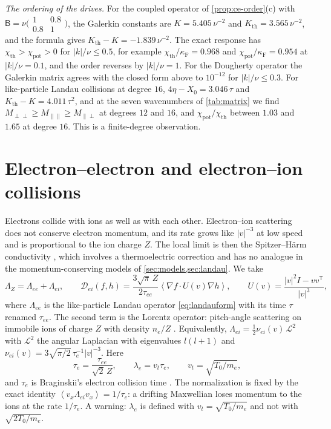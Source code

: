 \documentclass[11pt]{article}
\newcommand{\av}[1]{\left\langle #1\right\rangle}
\newcommand{\D}{\mathcal D}
\newcommand{\F}{\kappa_{\mathrm F}}
\newcommand{\thr}{\mathrm{th}}
\newcommand{\pot}{\mathrm{pot}}
\theoremstyle{definition}
\theoremstyle{remark}
\numberwithin{equation}{section}
\begin{document}
\emph{The ordering of the drives.} For the coupled operator of
\cref{prop:ce-order}(c) with $\mathsf B=\nu\bigl(\begin{smallmatrix}1&0.8\\0.8&1\end{smallmatrix}\bigr)$,
the Galerkin constants are $K=5.405\,\nu^{-2}$ and
$K_\thr=3.565\,\nu^{-2}$, and the formula gives
$K_\thr-K=-1.839\,\nu^{-2}$. The exact response has
$\chi_\thr>\chi_\pot>0$ for $|k|/\nu\leq0.5$, for example
$\chi_\thr/\F=0.968$ and $\chi_\pot/\F=0.954$ at $|k|/\nu=0.1$, and the
order reverses by $|k|/\nu=1$. For the Dougherty operator the Galerkin
matrix agrees with the closed form above to $10^{-12}$ for $|k|/\nu\leq0.3$.
For like-particle Landau collisions at degree $16$,
$4\eta-X_0=3.046\,\tau$ and $K_\thr-K=4.011\,\tau^2$, and at the seven
wavenumbers of \cref{tab:matrix} we find
$M_{\perp\perp}\geq M_{\parallel\parallel}\geq M_{\parallel\perp}$ at
degrees $12$ and $16$, and $\chi_\pot/\chi_\thr$ between $1.03$ and
$1.65$ at degree $16$. This is a finite-degree observation.

\FloatBarrier
\section{Electron--electron and electron--ion collisions}\label{sec:th-electron}

Electrons collide with ions as well as with each other. Electron--ion
scattering does not conserve electron momentum, and its rate grows like
$|v|^{-3}$ at low speed and is proportional to the ion charge $Z$. The
local limit is then the Spitzer--H\"arm conductivity
\cite{SpitzerHarm1953,Braginskii1965}, which involves a thermoelectric
correction and has no analogue in the momentum-conserving models of
\cref{sec:models,sec:landau}. We take
\begin{equation}
 \Lambda_Z=\Lambda_{ee}+\Lambda_{ei},\qquad
 \D_{ei}(f,h)=\frac{3\sqrt\pi\,Z}{2\tau_{ee}}
   \av{\nabla f\cdot U(v)\nabla h},\qquad
 U(v)=\frac{|v|^2I-vv^{\mathsf T}}{|v|^3},
 \label{eq:th-electron}
\end{equation}
where $\Lambda_{ee}$ is the like-particle Landau operator \eqref{eq:landauform} with its time $\tau$ renamed $\tau_{ee}$. The second
term is the Lorentz operator: pitch-angle scattering on immobile ions of
charge $Z$ with density $n_e/Z$ \cite{HelanderSigmar2002}. Equivalently,
$\Lambda_{ei}=\tfrac12\nu_{ei}(v)\,\mathcal L^2$ with $\mathcal L^2$ the
angular Laplacian with eigenvalues $l(l+1)$ and
$\nu_{ei}(v)=3\sqrt{\pi/2}\,\tau_e^{-1}|v|^{-3}$. Here
\begin{equation}
 \tau_e=\frac{\tau_{ee}}{\sqrt2\,Z},\qquad \lambda_e=v_t\tau_e,\qquad
 v_t=\sqrt{T_0/m_e},
 \label{eq:th-taue}
\end{equation}
and $\tau_e$ is Braginskii's electron collision time
\cite{Braginskii1965}. The normalization is fixed by the exact identity
$\av{v_x\Lambda_{ei}v_x}=1/\tau_e$: a drifting Maxwellian loses momentum
to the ions at the rate $1/\tau_e$. A warning: $\lambda_e$ is defined with
$v_t=\sqrt{T_0/m_e}$ and not with $\sqrt{2T_0/m_e}$.
\end{document}
